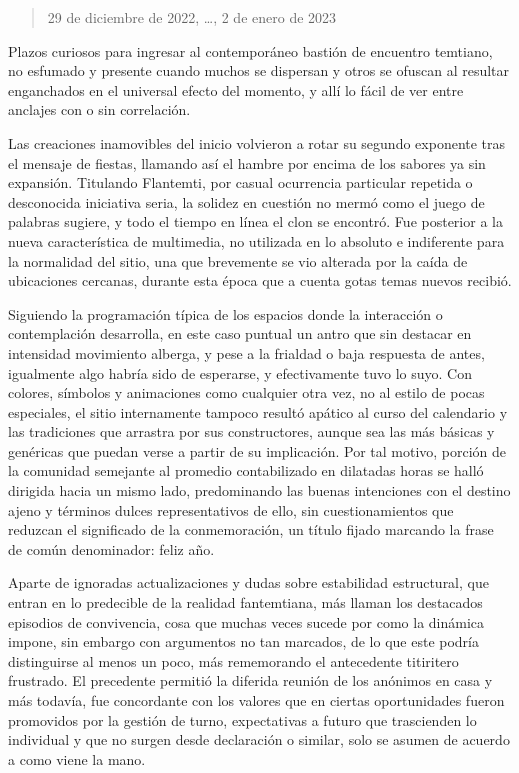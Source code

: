 \documentclass[
]{book}
\begin{document}
\begin{quote}
29 de diciembre de 2022, \ldots, 2 de enero de 2023
\end{quote}

Plazos curiosos para ingresar al contemporáneo bastión de encuentro temtiano, no esfumado y presente cuando muchos se dispersan y otros se ofuscan al resultar enganchados en el universal efecto del momento, y allí lo fácil de ver entre anclajes con o sin correlación.

Las creaciones inamovibles del inicio volvieron a rotar su segundo exponente tras el mensaje de fiestas, llamando así el hambre por encima de los sabores ya sin expansión. Titulando Flantemti, por casual ocurrencia particular repetida o desconocida iniciativa seria, la solidez en cuestión no mermó como el juego de palabras sugiere, y todo el tiempo en línea el clon se encontró. Fue posterior a la nueva característica de multimedia, no utilizada en lo absoluto e indiferente para la normalidad del sitio, una que brevemente se vio alterada por la caída de ubicaciones cercanas, durante esta época que a cuenta gotas temas nuevos recibió.

Siguiendo la programación típica de los espacios donde la interacción o contemplación desarrolla, en este caso puntual un antro que sin destacar en intensidad movimiento alberga, y pese a la frialdad o baja respuesta de antes, igualmente algo habría sido de esperarse, y efectivamente tuvo lo suyo. Con colores, símbolos y animaciones como cualquier otra vez, no al estilo de pocas especiales, el sitio internamente tampoco resultó apático al curso del calendario y las tradiciones que arrastra por sus constructores, aunque sea las más básicas y genéricas que puedan verse a partir de su implicación. Por tal motivo, porción de la comunidad semejante al promedio contabilizado en dilatadas horas se halló dirigida hacia un mismo lado, predominando las buenas intenciones con el destino ajeno y términos dulces representativos de ello, sin cuestionamientos que reduzcan el significado de la conmemoración, un título fijado marcando la frase de común denominador: feliz año.

Aparte de ignoradas actualizaciones y dudas sobre estabilidad estructural, que entran en lo predecible de la realidad fantemtiana, más llaman los destacados episodios de convivencia, cosa que muchas veces sucede por como la dinámica impone, sin embargo con argumentos no tan marcados, de lo que este podría distinguirse al menos un poco, más rememorando el antecedente titiritero frustrado. El precedente permitió la diferida reunión de los anónimos en casa y más todavía, fue concordante con los valores que en ciertas oportunidades fueron promovidos por la gestión de turno, expectativas a futuro que trascienden lo individual y que no surgen desde declaración o similar, solo se asumen de acuerdo a como viene la mano.
\end{document}
